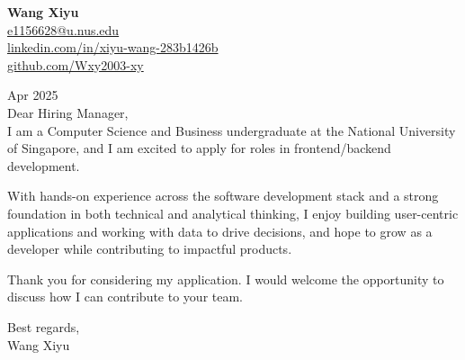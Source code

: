 \documentclass[12pt]{article}
\begin{document}
\noindent
\textbf{Wang Xiyu} \\
\href{mailto:e1156628@u.nus.edu}{e1156628@u.nus.edu} \\
\href{https://www.linkedin.com/in/xiyu-wang-283b1426b}{linkedin.com/in/xiyu-wang-283b1426b} \\
\href{https://github.com/Wxy2003-xy}{github.com/Wxy2003-xy} \\

\vspace{1em}

 Apr 2025 \\

\noindent
Dear Hiring Manager, \\

\vspace{0.5em}
I am a Computer Science and Business undergraduate at the National University of Singapore, and I am excited to apply for roles in frontend/backend development.

With hands-on experience across the software development stack and a strong foundation in both technical and analytical thinking, I enjoy building user-centric applications and working with data to drive decisions, and hope to grow as a developer while contributing to impactful products.

Thank you for considering my application. I would welcome the opportunity to discuss how I can contribute to your team.

\vspace{1em}

\noindent
Best regards, \\
Wang Xiyu
\end{document}
